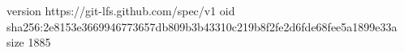 version https://git-lfs.github.com/spec/v1
oid sha256:2e8153e3669946773657db809b3b43310c219b8f2fe2d6fde68fee5a1899e33a
size 1885
